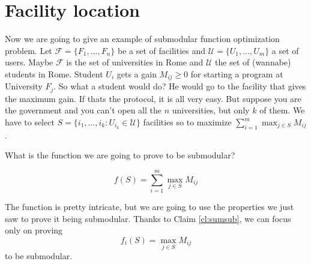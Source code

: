 \section{Facility location}
Now we are going to give an example of submodular function optimization problem. Let $\mathcal{F} = \{F_1, \ldots, F_n\}$ be a set of facilities and $\mathcal{U} = \{U_1,\ldots, U_m\}$ a set of users. Maybe $\mathcal{F}$ is the set of universities in Rome and $\mathcal{U}$ the set of (wannabe) students in Rome. Student $U_i$ gets a gain $M_{ij} \geq 0$ for starting a program at University $F_j$. So what a student would do? He would go to the facility that gives the maximum gain. If thats the protocol, it is all very easy. But suppose you are the government and you can't open all the $n$ universities, but only $k$ of them. We have to select $S = \{i_1,\ldots, i_k : U_{i_k} \in \mathcal{U}\}$ facilities so to maximize $\sum_{i = 1}^m \max_{j \in S} M_{ij}$.

What is the function we are going to prove to be submodular?

\begin{equation}
f(S) = \sum_{i=1}^m\max_{j \in S}M_{ij}
\end{equation}

The function is pretty intricate, but we are going to use the properties we just saw to prove it being submodular. Thanks to Claim \ref{cl:sumsub}, we can focus only on proving 
\begin{equation}
	f_i(S) = \max_{j \in S}M_{ij}
\end{equation}
to be submodular.

